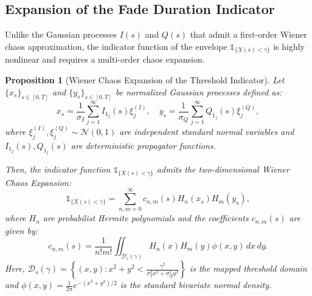 \documentclass[11pt]{article}
\newtheorem{proposition}{Proposition}
\begin{document}
\subsection{Expansion of the Fade Duration Indicator}

Unlike the Gaussian processes $I(s)$ and $Q(s)$ that admit a first-order Wiener chaos approximation, the indicator function of the envelope $\mathds{1}_{\{X(s) < \gamma\}}$ is highly nonlinear and requires a multi-order chaos expansion.

\begin{proposition}[Wiener Chaos Expansion of the Threshold Indicator]\label{prop:ou_exact}
Let $\{x_s\}_{s \in [0,T]}$ and $\{y_s\}_{s \in [0,T]}$ be normalized Gaussian processes defined as:
\begin{equation}
    x_s = \frac{1}{\sigma_I} \sum_{j=1}^\infty I_{1_j}(s) \xi_j^{(I)}, \quad y_s = \frac{1}{\sigma_Q} \sum_{j=1}^\infty Q_{1_j}(s) \xi_j^{(Q)},
\end{equation}
where $\xi_j^{(I)}, \xi_j^{(Q)} \sim \mathcal{N}(0,1)$ are independent standard normal variables and $I_{1_j}(s), Q_{1_j}(s)$ are deterministic propagator functions.

Then, the indicator function $\mathds{1}_{\{X(s) < \gamma\}}$ admits the two-dimensional Wiener Chaos Expansion:
\begin{equation}
    \mathds{1}_{\{X(s) < \gamma\}} = \sum_{n,m=0}^\infty c_{n,m}(s) H_n(x_s) H_m(y_s),
\end{equation}
where $H_n$ are probabilist Hermite polynomials and the coefficients $c_{n,m}(s)$ are given by:
\begin{equation}
    c_{n,m}(s) = \frac{1}{n! m!} \iint_{\mathcal{D}_s(\gamma)} H_n(x) H_m(y) \phi(x,y) \, dx \, dy.
\end{equation}
Here, $\mathcal{D}_s(\gamma) = \left\{(x,y) : x^2 + y^2 < \frac{\gamma^2}{\sigma_I^2 x^2 + \sigma_Q^2 y^2}\right\}$ is the mapped threshold domain and $\phi(x,y) = \frac{1}{2\pi} e^{-(x^2+y^2)/2}$ is the standard bivariate normal density.
\end{proposition}
\end{document}

